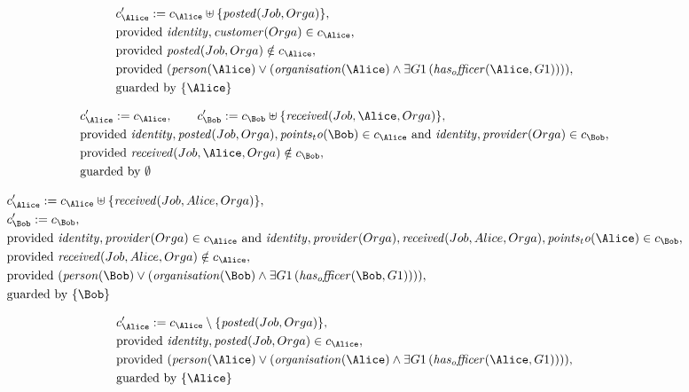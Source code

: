 \begin{align*}
&
c'_
{
\Alice
}
 := 
c_
{
\Alice
}
 \uplus 
\{
\mathit{
posted
}
(
Job
,
Orga
)
\}
,\\
&
\text{provided } 
\mathit{
identity
}
,
\mathit{
customer
}
(
Orga
)
 \in c_
{
\Alice
}
,\\
&
\text{provided } 
\mathit{
posted
}
(
Job
,
Orga
)
 \notin c_
{
\Alice
}
,\\
&
\text{provided } 
(
\mathit{
person
}
(
\Alice
)
\lor
(
\mathit{
organisation
}
(
\Alice
)
\land
\exists 
G1
\,(
\mathit{
has_officer
}
(
\Alice
,
G1
)
)
)
)
,\\
&
\text{guarded by } \{
\Alice
\}
\end{align*}

\begin{align*}
&
c'_
{
\Alice
}
 := 
c_
{
\Alice
}
, \qquad 
c'_
{
\Bob
}
 := 
c_
{
\Bob
}
 \uplus 
\{
\mathit{
received
}
(
Job
,
\Alice
,
Orga
)
\}
,\\
&
\text{provided } 
\mathit{
identity
}
,
\mathit{
posted
}
(
Job
,
Orga
)
,
\mathit{
points_to
}
(
\Bob
)
 \in c_
{
\Alice
}
 \text{ and } 
\mathit{
identity
}
,
\mathit{
provider
}
(
Orga
)
 \in c_
{
\Bob
}
,\\
&
\text{provided } 
\mathit{
received
}
(
Job
,
\Alice
,
Orga
)
 \notin c_
{
\Bob
}
,\\
&
\text{guarded by } \emptyset
\end{align*}

\begin{align*}
&
c'_
{
\Alice
}
 := 
c_
{
\Alice
}
 \uplus 
\{
\mathit{
received
}
(
Job
,
Alice
,
Orga
)
\}
,\\
&
c'_
{
\Bob
}
 := 
c_
{
\Bob
}
,\\
&
\text{provided } 
\mathit{
identity
}
,
\mathit{
provider
}
(
Orga
)
 \in c_
{
\Alice
}
 \text{ and } 
\mathit{
identity
}
,
\mathit{
provider
}
(
Orga
)
,
\mathit{
received
}
(
Job
,
Alice
,
Orga
)
,
\mathit{
points_to
}
(
\Alice
)
 \in c_
{
\Bob
}
,\\
&
\text{provided } 
\mathit{
received
}
(
Job
,
Alice
,
Orga
)
 \notin c_
{
\Alice
}
,\\
&
\text{provided } 
(
\mathit{
person
}
(
\Bob
)
\lor
(
\mathit{
organisation
}
(
\Bob
)
\land
\exists 
G1
\,(
\mathit{
has_officer
}
(
\Bob
,
G1
)
)
)
)
,\\
&
\text{guarded by } \{
\Bob
\}
\end{align*}

\begin{align*}
&
c'_
{
\Alice
}
 := 
c_
{
\Alice
}
 \setminus 
\{
\mathit{
posted
}
(
Job
,
Orga
)
\}
,\\
&
\text{provided } 
\mathit{
identity
}
,
\mathit{
posted
}
(
Job
,
Orga
)
 \in c_
{
\Alice
}
,\\
&
\text{provided } 
(
\mathit{
person
}
(
\Alice
)
\lor
(
\mathit{
organisation
}
(
\Alice
)
\land
\exists 
G1
\,(
\mathit{
has_officer
}
(
\Alice
,
G1
)
)
)
)
,\\
&
\text{guarded by } \{
\Alice
\}
\end{align*}
